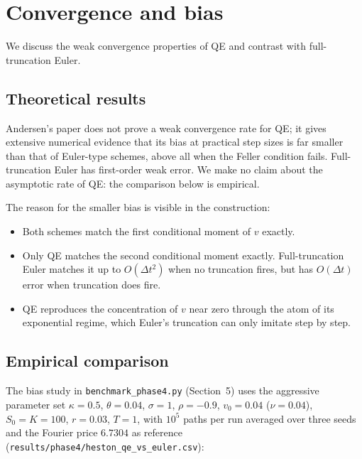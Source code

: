 \documentclass[11pt]{article}
\theoremstyle{plain}
\theoremstyle{definition}
\theoremstyle{remark}
\begin{document}
\section{Convergence and bias}

We discuss the weak convergence properties of QE and contrast with full-truncation Euler.

\subsection{Theoretical results}

Andersen's paper does not prove a weak convergence rate for QE; it gives extensive numerical evidence that its bias at practical step sizes is far smaller than that of Euler-type schemes, above all when the Feller condition fails. Full-truncation Euler has first-order weak error. We make no claim about the asymptotic rate of QE: the comparison below is empirical.

The reason for the smaller bias is visible in the construction:
\begin{itemize}[topsep=2pt]
    \item Both schemes match the first conditional moment of $v$ exactly.
    \item Only QE matches the second conditional moment exactly. Full-truncation Euler matches it up to $O(\Delta t^2)$ when no truncation fires, but has $O(\Delta t)$ error when truncation does fire.
    \item QE reproduces the concentration of $v$ near zero through the atom of its exponential regime, which Euler's truncation can only imitate step by step.
\end{itemize}

\subsection{Empirical comparison}

The bias study in \texttt{benchmark\_phase4.py} (Section~5) uses the aggressive parameter set $\kappa = 0.5$, $\theta = 0.04$, $\sigma = 1$, $\rho = -0.9$, $v_0 = 0.04$ ($\nu = 0.04$), $S_0 = K = 100$, $r = 0.03$, $T = 1$, with $10^5$ paths per run averaged over three seeds and the Fourier price $6.7304$ as reference (\texttt{results/phase4/heston\_qe\_vs\_euler.csv}):
\end{document}
